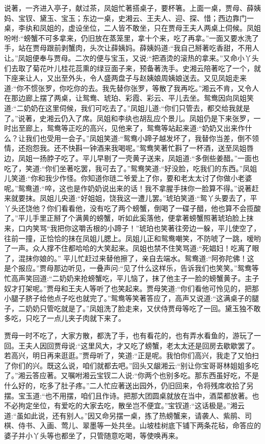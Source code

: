 \begin{parag}
    说著，一齐进入亭子，献过茶，凤姐忙著搭桌子，要杯箸。上面一桌，贾母、薛姨妈、宝钗、黛玉、宝玉；东边一桌，史湘云、王夫人、迎、探、惜；西边靠门一桌，李纨和凤姐的，虚设坐位，二人皆不敢坐，只在贾母王夫人两桌上伺候。凤姐吩咐:“螃蟹不可多拿来，仍旧放在蒸笼里，拿十个来，吃了再拿。”一面又要水洗了手，站在贾母跟前剥蟹肉，头次让薛姨妈。薛姨妈道:“我自己掰著吃香甜，不用人让。”凤姐便奉与贾母。二次的便与宝玉，又说:“把酒烫的滚热的拿来。”又命小丫头们去取了菊花叶儿桂花蕊熏的绿豆面子来，预备著洗手。史湘云陪著吃了一个，就下座来让人，又出至外头，令人盛两盘子与赵姨娘周姨娘送去。又见凤姐走来道:“你不惯张罗，你吃你的去。我先替你张罗，等散了我再吃。”湘云不肯，又令人在那边廊上摆了两桌，让鸳鸯、琥珀、彩霞、彩云、平儿去坐。鸳鸯因向凤姐笑道:“二奶奶在这里伺候，我们可吃去了。”凤姐儿道:“你们只管去，都交给我就是了。”说著，史湘云仍入了席。凤姐和李纨也胡乱应个景儿。凤姐仍是下来张罗，一时出至廊上，鸳鸯等正吃的高兴，见他来了，鸳鸯等站起来道:“奶奶又出来作什么？让我们也受用一会子。”凤姐笑道:“鸳鸯小蹄子越发坏了，我替你当差，倒不领情，还抱怨我。还不快斟一钟酒来我喝呢。”鸳鸯笑著忙斟了一杯酒，送至凤姐唇边，凤姐一扬脖子吃了。平儿早剔了一壳黄子送来，凤姐道:“多倒些姜醋。”一面也吃了，笑道:“你们坐著吃罢，我可去了。”鸳鸯笑道:“好没脸，吃我们的东西。”凤姐儿笑道:“你和我少作怪。你知道你琏二爷爱上了你，要和老太太讨了你做小老婆呢。”鸳鸯道:“啐，这也是作奶奶说出来的话！我不拿腥手抹你一脸算不得。”说著赶来就要抹。凤姐儿央道:“好姐姐，饶我这一遭儿罢。”琥珀笑道:“鸳丫头要去了，平丫头还饶他？你们看看他，没有吃了两个螃蟹，倒喝了一碟子醋，他也算不会揽酸了。”平儿手里正掰了个满黄的螃蟹，听如此奚落他，便拿著螃蟹照著琥珀脸上抹来，口内笑骂“我把你这嚼舌根的小蹄子！”琥珀也笑著往旁边一躲，平儿使空了，往前一撞，正恰恰的抹在凤姐儿腮上。凤姐儿正和鸳鸯嘲笑，不防唬了一跳，嗳哟了一声。众人撑不住都哈哈的大笑起来。凤姐也禁不住笑骂道:“死娼妇！吃离了眼了，混抹你娘的。” 平儿忙赶过来替他擦了，亲自去端水。鸳鸯道:“阿弥陀佛！这是个报应。”贾母那边听见，一叠声问:“见了什么这样乐，告诉我们也笑笑。”鸳鸯等忙高声笑回道:“二奶奶来抢螃蟹吃，平儿恼了，抹了他主子一脸的螃蟹黄子。主子奴才打架呢。”贾母和王夫人等听了也笑起来。贾母笑道:“你们看他可怜见的，把那小腿子脐子给他点子吃也就完了。”鸳鸯等笑著答应了，高声又说道:“这满桌子的腿子，二奶奶只管吃就是了。”凤姐洗了脸走来，又伏侍贾母等吃了一回。黛玉独不敢多吃，只吃了一点儿夹子肉就下来了。
\end{parag}


\begin{parag}
    贾母一时不吃了，大家方散，都洗了手，也有看花的，也有弄水看鱼的，游玩了一回。王夫人因回贾母说:“这里风大，才又吃了螃蟹，老太太还是回房去歇歇罢了。若高兴，明日再来逛逛。”贾母听了，笑道:“正是呢。我怕你们高兴，我走了又怕扫了你们的兴。既这么说，咱们就都去吧。”回头又龈湘云:“别让你宝哥哥林姐姐多吃了。”湘云答应著。又嘱咐湘云宝钗二人说:“你两个也别多吃。那东西虽好吃，不是什么好的，吃多了肚子疼。”二人忙应著送出园外，仍旧回来，令将残席收拾了另摆。宝玉道:“也不用摆，咱们且作诗。把那大团圆桌就放在当中，酒菜都放著。也不必拘定坐位，有爱吃的大家去吃，散坐岂不便宜。”宝钗道:“这话极是。”湘云道:“虽如此说，还有别人。”因又命另摆一桌，拣了热螃蟹来，请袭人、紫鹃、司棋、侍书、入画、莺儿、翠墨等一处共坐。山坡桂树底下铺下两条花毡，命答应的婆子并小丫头等也都坐了，只管随意吃喝，等使唤再来。
\end{parag}


